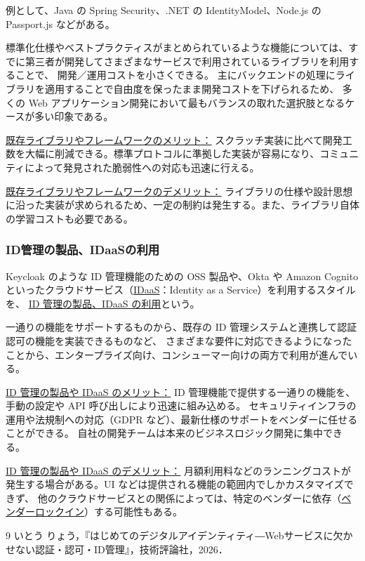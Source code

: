 \documentclass[uplatex]{jsarticle}
\def\label#1{}%
\begin{document}
\begin{exa}[認証・認可のライブラリやフレームワーク]\label{exa:ch6-libraries}
例として、Java の Spring Security、.NET の IdentityModel、Node.js の Passport.js などがある。
\end{exa}

標準化仕様やベストプラクティスがまとめられているような機能については、すでに第三者が開発してさまざまなサービスで利用されているライブラリを利用することで、
開発／運用コストを小さくできる。
主にバックエンドの処理にライブラリを適用することで自由度を保ったまま開発コストを下げられるため、
多くの Web アプリケーション開発において最もバランスの取れた選択肢となるケースが多い印象である。

\underline{既存ライブラリやフレームワークのメリット：}
スクラッチ実装に比べて開発工数を大幅に削減できる。標準プロトコルに準拠した実装が容易になり、コミュニティによって発見された脆弱性への対応も迅速に行える。

\underline{既存ライブラリやフレームワークのデメリット：}
ライブラリの仕様や設計思想に沿った実装が求められるため、一定の制約は発生する。また、ライブラリ自体の学習コストも必要である。

\subsubsection{ID管理の製品、IDaaSの利用}

\begin{dfn}\label{dfn:ch6-idaas}
Keycloak のような ID 管理機能のための OSS 製品や、Okta や Amazon Cognito といったクラウドサービス（\underline{IDaaS}：Identity as a Service）を利用するスタイルを、
\underline{ID 管理の製品、IDaaS の利用}という。
\end{dfn}

一通りの機能をサポートするものから、既存の ID 管理システムと連携して認証認可の機能を実装できるものなど、
さまざまな要件に対応できるようになったことから、エンタープライズ向け、コンシューマー向けの両方で利用が進んでいる。

\underline{ID 管理の製品や IDaaS のメリット：}
ID 管理機能で提供する一通りの機能を、手動の設定や API 呼び出しにより迅速に組み込める。
セキュリティインフラの運用や法規制への対応（GDPR など）、最新仕様のサポートをベンダーに任せることができる。
自社の開発チームは本来のビジネスロジック開発に集中できる。

\underline{ID 管理の製品や IDaaS のデメリット：}
月額利用料などのランニングコストが発生する場合がある。UI などは提供される機能の範囲内でしかカスタマイズできず、
他のクラウドサービスとの関係によっては、特定のベンダーに依存（\underline{ベンダーロックイン}）する可能性もある。

\begin{thebibliography}{9}
いとう りょう，『はじめてのデジタルアイデンティティ―Webサービスに欠かせない認証・認可・ID管理』，技術評論社，2026．
\end{thebibliography}
\end{document}
